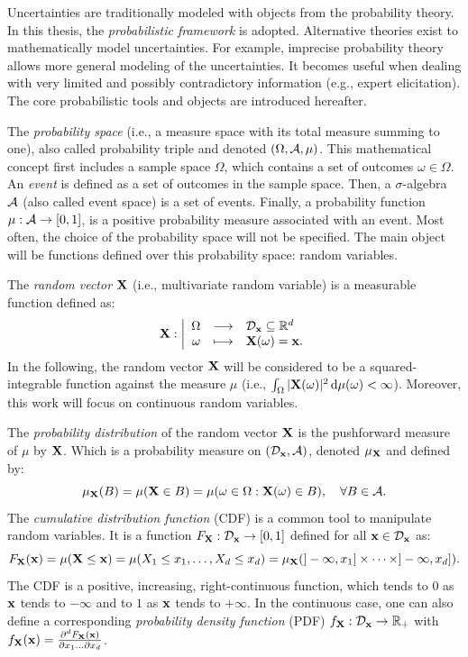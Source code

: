 Uncertainties are traditionally modeled with objects from the probability theory.
In this thesis, the \textit{probabilistic framework} is adopted. 
Alternative theories exist to mathematically model uncertainties. 
For example, imprecise probability theory allows more general modeling of the uncertainties. 
It becomes useful when dealing with very limited and possibly contradictory information (e.g., expert elicitation). 
The core probabilistic tools and objects are introduced hereafter. 

The \textit{probability space} (i.e., a measure space with its total measure summing to one), also called probability triple and denoted $(\Omega, \mathcal{A}, \mu)$.
This mathematical concept first includes a sample space $\Omega$, which contains a set of outcomes $\omega \in \Omega$. 
An \textit{event} is defined as a set of outcomes in the sample space.
Then, a $\sigma$-algebra $\mathcal{A}$ (also called event space) is a set of events. 
Finally, a probability function $\mu: \mathcal{A} \rightarrow [0, 1]$, is a positive probability measure associated with an event.
Most often, the choice of the probability space will not be specified. 
The main object will be functions defined over this probability space: random variables. 

The \textit{random vector} ${\bf X}$ (i.e., multivariate random variable) is a measurable function defined as: 
\begin{equation}
{\bf X} : \bigg|
\begin{array}{rcl}
    \Omega & \longrightarrow & \mathcal{D}_{{\bf x}} \subseteq \mathbb{R}^d\\
    \omega & \longmapsto & {\bf X}(\omega) = {\bf x}.
\end{array}
\end{equation}
In the following, the random vector ${\bf X}$ will be considered to be a squared-integrable function against the measure $\mu$ (i.e., $\int_{\Omega} |{\bf X}(\omega)|^2 \,\mathrm{d} \mu(\omega) < \infty$).
Moreover, this work will focus on continuous random variables.

The \textit{probability distribution} of the random vector ${\bf X}$ is the pushforward measure of $\mu$ by ${\bf X}$.
Which is a probability measure on $(\mathcal{D}_{{\bf x}}, \mathcal{A})$, denoted $\mu_{{\bf X}}$ and defined by: 
\begin{equation}
    \mu_{{\bf X}}(B) = \mu({\bf X} \in B) = \mu(\omega \in \Omega : {\bf X}(\omega)\in B), \quad \forall B \in \mathcal{A}.
\end{equation}
The \textit{cumulative distribution function} (CDF) is a common tool to manipulate random variables. 
It is a function $F_{{\bf X}} : \mathcal{D}_{{\bf x}} \rightarrow [0, 1]$ defined for all ${\bf x} \in \mathcal{D}_{{\bf x}}$ as: 
\begin{equation}
    F_{{\bf X}}({\bf x}) = \mu({\bf X} \leq {\bf x})
            = \mu(X_1 \leq x_1, \dots, X_d \leq x_d)
            = \mu_{{\bf X}}(]-\infty, x_1] \times \dots \times ]-\infty, x_d]).
\end{equation}
The CDF is a positive, increasing, right-continuous function, which tends to $0$ as ${\bf x}$ tends to $-\infty$ and to $1$ as ${\bf x}$ tends to $+\infty$.
In the continuous case, one can also define a corresponding \textit{probability density function} (PDF) $f_{{\bf X}}: \mathcal{D}_{{\bf x}} \rightarrow \mathbb{R}_+$  with 
$f_{{\bf X}}({\bf x}) = \frac{\partial^d F_{{\bf X}}({\bf x})}{\partial x_1 \dots \partial x_d}$.

